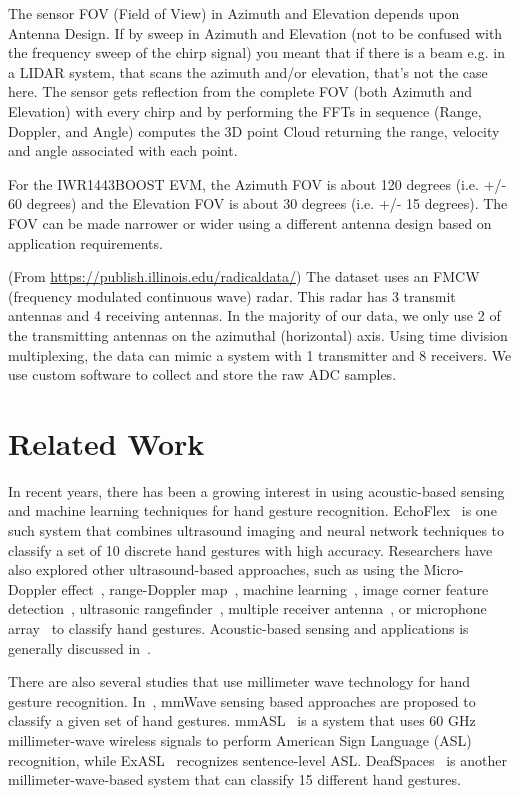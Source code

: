 \documentclass[11pt, oneside]{article}   	%
\begin{document}
The sensor FOV (Field of View) in Azimuth and Elevation depends upon Antenna Design. If by sweep in Azimuth and Elevation (not to be confused with the frequency sweep of the chirp signal) you meant that if there is a beam e.g. in a LIDAR system, that scans the azimuth and/or elevation, that's not the case here. The sensor gets reflection from the complete FOV (both Azimuth and Elevation) with every chirp and by performing the FFTs in sequence (Range, Doppler, and Angle) computes the 3D point Cloud returning the range, velocity and angle associated with each point.

For the IWR1443BOOST EVM, the Azimuth FOV is about 120 degrees (i.e. +/- 60 degrees) and the Elevation FOV is about 30 degrees (i.e. +/- 15 degrees). The FOV can be made narrower or wider using a different antenna design based on application requirements.


(From \url{https://publish.illinois.edu/radicaldata/}) The dataset uses an FMCW (frequency modulated continuous wave) radar. This radar has 3 transmit antennas and 4 receiving antennas. In the majority of our data, we only use 2 of the transmitting antennas on the azimuthal (horizontal) axis. Using time division multiplexing, the data can mimic a system with 1 transmitter and 8 receivers. We use custom software to collect and store the raw ADC samples.


\section{Related Work}
In recent years, there has been a growing interest in using acoustic-based sensing and machine learning techniques for hand gesture recognition. EchoFlex~\cite{ref:echoflex17} is one such system that combines ultrasound imaging and neural network techniques to classify a set of 10 discrete hand gestures with high accuracy. Researchers have also explored other ultrasound-based approaches, such as using the Micro-Doppler effect~\cite{ref:usgr19}, range-Doppler map~\cite{ref:hgr22}, machine learning~\cite{ref:mhgr18}, image corner feature detection~\cite{ref:usgdr21}, ultrasonic rangefinder~\cite{ref:ss12}, multiple receiver antenna~\cite{ref:usgr18}, or microphone array~\cite{ref:usgr17} to classify hand gestures.  Acoustic-based sensing and applications is generally discussed in~\cite{ref:absa20}. 

There are also several studies that use millimeter wave technology for hand gesture recognition. In~\cite{ref:hgrmmv21, ref:slgrmmw22}, mmWave sensing based approaches are proposed to classify a given set of hand gestures. mmASL~\cite{ref:mmasl} is a system that uses 60 GHz millimeter-wave wireless signals to perform American Sign Language (ASL) recognition, while ExASL~\cite{ref:exasl20} recognizes sentence-level ASL. DeafSpaces~\cite{ref:deafspaces21} is another millimeter-wave-based system that can classify 15 different hand gestures. 
\end{document}

